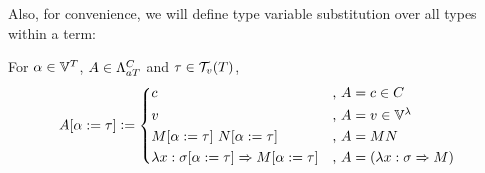 \documentclass[main.tex]{subfiles}
\begin{document}
Also, for convenience, we will define type variable substitution over all types
within a term:

\begin{defn}
    For $\alpha \in \tvars$, $A \in \tvlambda{T}{C}$ and $\tau \in \tvclos{T}$,
    \[
        \subst{A}{\alpha}{\tau} \defeq
        \begin{cases*}
            c &, $A = c \in C$ \\
            v &, $A = v \in \lvars$ \\
            \subst{M}{\alpha}{\tau} \app \subst{N}{\alpha}{\tau}
                &, $A = MN$ \\
            \lambda x : \subst{\sigma}{\alpha}{\tau} \abstr \subst{M}{\alpha}{\tau}
                &, $A = (\lambda x : \sigma \abstr M)$ \\
        \end{cases*}
    \]
\end{defn}
\end{document}
